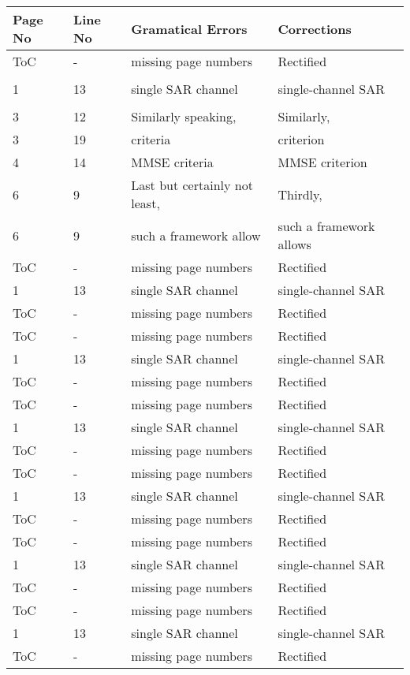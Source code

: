 \noindent
\begin{longtable}[c]{p{}|p{}|p{}|p{}}
\textbf{Page No} & \textbf{Line No} & \textbf{Gramatical Errors} & \textbf{Corrections} \\
 \hline
 \endhead
ToC & - & missing page numbers & Rectified \\
 & & & \\
1 & 13 & single SAR channel & single-channel SAR \\ 
 & & & \\
3 & 12 & Similarly speaking, & Similarly, \\
3 & 19 & criteria & criterion \\ 
4 & 14 & MMSE criteria & MMSE criterion \\
6 & 9 & Last but certainly not least, & Thirdly, \\ 
6 & 9 & such a framework allow & such a framework allows \\[10pt]
ToC & - & missing page numbers & Rectified \\[10pt]
1 & 13 & single SAR channel & single-channel SAR \\ 
ToC & - & missing page numbers & Rectified \\
ToC & - & missing page numbers & Rectified \\
1 & 13 & single SAR channel & single-channel SAR \\ 
ToC & - & missing page numbers & Rectified \\
ToC & - & missing page numbers & Rectified \\
1 & 13 & single SAR channel & single-channel SAR \\ 
ToC & - & missing page numbers & Rectified \\
ToC & - & missing page numbers & Rectified \\
1 & 13 & single SAR channel & single-channel SAR \\ 
ToC & - & missing page numbers & Rectified \\
ToC & - & missing page numbers & Rectified \\
1 & 13 & single SAR channel & single-channel SAR \\ 
ToC & - & missing page numbers & Rectified \\
ToC & - & missing page numbers & Rectified \\
1 & 13 & single SAR channel & single-channel SAR \\ 
ToC & - & missing page numbers & Rectified \\

\end{longtable}
